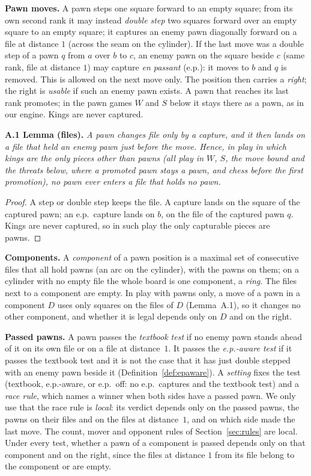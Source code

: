 \textbf{Pawn moves.} A pawn steps one square forward to an empty square; from its own second rank it may instead
\emph{double step} two squares forward over an empty square to an empty square; it captures an enemy pawn diagonally
forward on a file at distance $1$ (across the seam on the cylinder). If the last move was a double step of a pawn $q$ from
$a$ over $b$ to $c$, an enemy pawn on the square beside $c$ (same rank, file at distance $1$) may capture \emph{en passant}
(e.p.): it moves to $b$ and $q$ is removed. This is allowed on the next move only. The position then carries a
\emph{right}; the right is \emph{usable} if such an enemy pawn exists. A pawn that reaches its last rank promotes; in the pawn games $W$ and $S$
below it stays there as a pawn, as in our engine. Kings are
never captured.

\textbf{A.1 Lemma (files).} \emph{A pawn changes file only by a capture, and it then lands on a file that held an enemy
pawn just before the move. Hence, in play in which kings are the only pieces other than pawns (all play in $W$, $S$, the
move bound and the threats below, where a promoted pawn stays a pawn, and chess before the first promotion), no pawn ever
enters a file that holds no pawn.}

\begin{proof}
A step or double step keeps the file. A capture lands on the square of the captured pawn; an e.p.\ capture lands on $b$,
on the file of the captured pawn $q$. Kings are never captured, so in such play the only capturable pieces are pawns.
\end{proof}

\textbf{Components.} A \emph{component} of a pawn position is a maximal set of consecutive files that all hold pawns (an
arc on the cylinder), with the pawns on them; on a cylinder with no empty file the whole board is one component, a
\emph{ring}. The files next to a component are empty. In play with pawns only, a move of a pawn in a component $D$ uses only squares on the files
of $D$ (Lemma~A.1), so it changes no other component, and whether it is legal depends only on $D$ and on the right.

\textbf{Passed pawns.} A pawn passes the \emph{textbook test} if no enemy pawn stands ahead of it on its own file or on a
file at distance~$1$. It passes the \emph{e.p.-aware test} if it passes the textbook test and it is not the case that it
has just double stepped with an enemy pawn beside it (Definition~\ref{def:epaware}). A \emph{setting} fixes the test
(textbook, e.p.-aware, or e.p.\ off: no e.p.\ captures and the textbook test) and a \emph{race rule}, which names a winner
when both sides have a passed pawn. We only use that the race rule is \emph{local}: its verdict depends only on the passed
pawns, the pawns on their files and on the files at distance~$1$, and on which side made the last move. The count, mover and
opponent rules of Section~\ref{sec:rules} are local. Under every test, whether a pawn of a component is passed depends only
on that component and on the right, since the files at distance $1$ from its file belong to the component or are empty.

